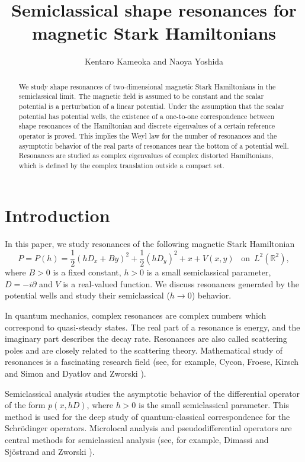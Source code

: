 \documentclass{article}
\theoremstyle{plain}
\theoremstyle{definition}
\theoremstyle{remark}
\newcommand{\RR}{\mathbb{R}}
\begin{document}
\title{Semiclassical shape resonances for magnetic Stark Hamiltonians}
\author{Kentaro Kameoka and Naoya Yoshida}

\date{}

\maketitle

\begin{abstract}
We study shape resonances of two-dimensional magnetic Stark Hamiltonians in the semiclassical limit. 
The magnetic field is assumed to be constant and 
the scalar potential is a perturbation of a linear potential. 
Under the assumption that the scalar potential has potential wells, 
the existence of a one-to-one correspondence between shape resonances of the Hamiltonian and discrete eigenvalues of 
a certain reference operator is proved. 
This implies the Weyl law for the number of resonances and 
the asymptotic behavior of the real parts of resonances near the bottom of a potential well. 
Resonances are studied as complex eigenvalues of complex distorted Hamiltonians, 
which is defined by the complex translation outside a compact set. 
\end{abstract}



\section{Introduction}\label{sec-1}

In this paper, we study resonances of the following magnetic Stark Hamiltonian
\[
P=P(h)=\frac{1}{2}(hD_x+By)^2+\frac{1}{2}(hD_y)^2+x+V(x, y)\,\,\,\,\, \mathrm{on}\,\,\,L^2(\RR^2), 
\]
where $B>0$ is a fixed constant, $h>0$ is a small semiclassical parameter, 
$D=-i\partial$ and $V$ is a real-valued function. 
We discuss resonances generated by the potential wells and study their semiclassical ($h\to 0$) behavior. 

In quantum mechanics, complex resonances are complex numbers which correspond to quasi-steady states. 
The real part of a resonance is energy, and the imaginary part describes the decay rate. 
Resonances are also called scattering poles and are closely related to the scattering theory. 
Mathematical study of resonances is a fascinating research field  
(see, for example, Cycon, Froese, Kirsch and Simon \cite{CFKS} and Dyatlov and Zworski \cite{DZ}). 

Semiclassical analysis studies the asymptotic behavior of the differential operator of the form 
$p(x, hD)$, where $h>0$ is the small semiclassical parameter. 
This method is used for the deep study of quantum-classical correspondence for the Schr\"{o}dinger operators.
Microlocal analysis and pseudodifferential operators are central methods for semiclassical analysis
(see, for example, Dimassi and Sj\"{o}strand \cite{DS} and Zworski \cite{Z}).
\end{document}
